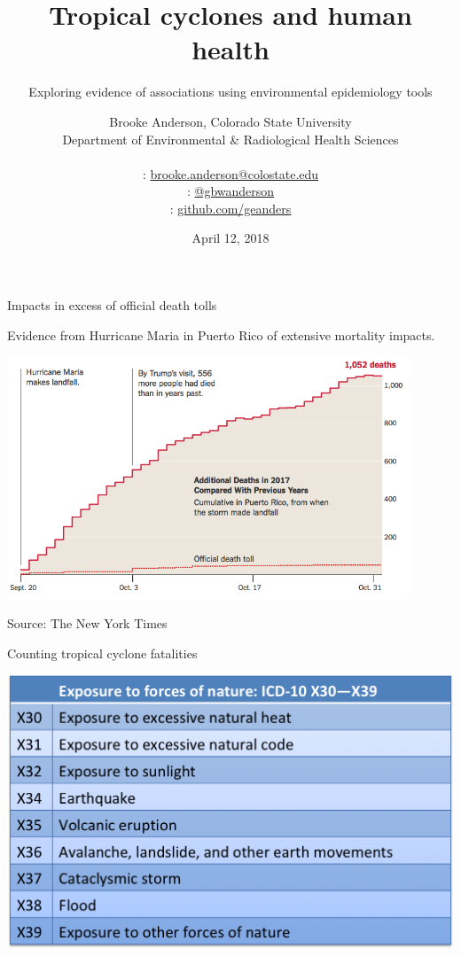 \documentclass[ignorenonframetext,]{beamer}
\title{Tropical cyclones and human health}
\subtitle{Exploring evidence of associations using environmental epidemiology tools}
\date{April 12, 2018}
\author[Anderson and Eddelbuettel]{
  Brooke Anderson, Colorado State University \\
  Department of Environmental \& Radiological Health Sciences \\ \\
  {\small \faEnvelope: \url{brooke.anderson@colostate.edu}} \\
  {\small \faTwitter: \href{www.twitter.com/gbwanderson}{@gbwanderson}} \\
  {\small \faGithub:  \url{github.com/geanders}} \\ 
  }
\date{}
\begin{document}
\begin{frame}
  \titlepage
\end{frame}

\begin{frame}{Impacts in excess of official death tolls}

Evidence from Hurricane Maria in Puerto Rico of extensive mortality
impacts.

\begin{center}\includegraphics[width=0.9\textwidth]{figures/maria_excess_deaths.png} \end{center}

\footnotesize Source: The New York Times

\end{frame}

\begin{frame}{Counting tropical cyclone fatalities}

\begin{center}\includegraphics[width=\textwidth]{figures/icd_disaster_codes} \end{center}

\end{frame}
\end{document}
